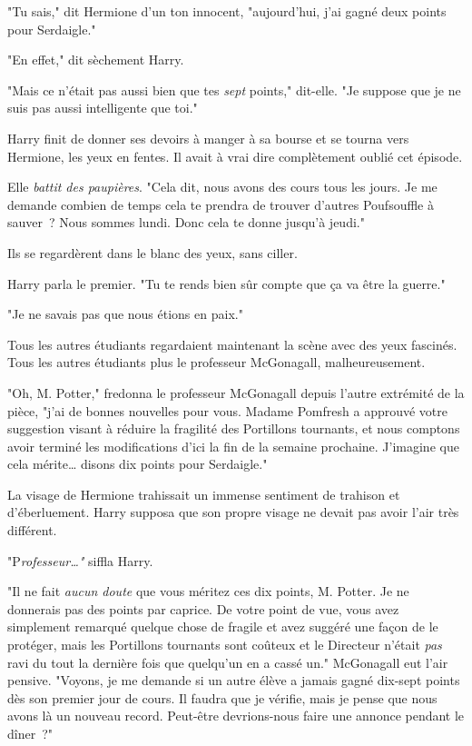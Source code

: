 "Tu sais," dit Hermione d'un ton innocent, "aujourd'hui, j'ai gagné deux points pour Serdaigle."

"En effet," dit sèchement Harry.

"Mais ce n'était pas aussi bien que tes \emph{sept} points," dit-elle. "Je suppose que je ne suis pas aussi intelligente que toi."

Harry finit de donner ses devoirs à manger à sa bourse et se tourna vers Hermione, les yeux en fentes. Il avait à vrai dire complètement oublié cet épisode.

Elle \emph{battit des paupières}. "Cela dit, nous avons des cours tous les jours. Je me demande combien de temps cela te prendra de trouver d'autres Poufsouffle à sauver~? Nous sommes lundi. Donc cela te donne jusqu'à jeudi."

Ils se regardèrent dans le blanc des yeux, sans ciller.

Harry parla le premier. "Tu te rends bien sûr compte que ça va être la guerre."

"Je ne savais pas que nous étions en paix."

Tous les autres étudiants regardaient maintenant la scène avec des yeux fascinés. Tous les autres étudiants plus le professeur McGonagall, malheureusement.

"Oh, M. Potter," fredonna le professeur McGonagall depuis l'autre extrémité de la pièce, "j'ai de bonnes nouvelles pour vous. Madame Pomfresh a approuvé votre suggestion visant à réduire la fragilité des Portillons tournants, et nous comptons avoir terminé les modifications d'ici la fin de la semaine prochaine. J'imagine que cela mérite… disons dix points pour Serdaigle."

La visage de Hermione trahissait un immense sentiment de trahison et d'éberluement. Harry supposa que son propre visage ne devait pas avoir l'air très différent.

"P\emph{rofesseur…"} siffla Harry.

"Il ne fait \emph{aucun doute} que vous méritez ces dix points, M. Potter. Je ne donnerais pas des points par caprice. De votre point de vue, vous avez simplement remarqué quelque chose de fragile et avez suggéré une façon de le protéger, mais les Portillons tournants sont coûteux et le Directeur n'était \emph{pas} ravi du tout la dernière fois que quelqu'un en a cassé un." McGonagall eut l'air pensive. "Voyons, je me demande si un autre élève a jamais gagné dix-sept points dès son premier jour de cours. Il faudra que je vérifie, mais je pense que nous avons là un nouveau record. Peut-être devrions-nous faire une annonce pendant le dîner~?"


